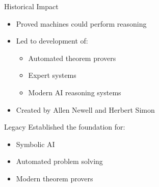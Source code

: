 \documentclass[aspectratio=169,t,xcolor=table]{beamer}
\begin{document}
\begin{frame}
\begin{columns}[t]
        \begin{column}{0.48\textwidth}
            \begin{block}{Historical Impact}
                \small
                \begin{itemize}\setlength{\itemsep}{0pt}
                    \item Proved machines could perform reasoning
                    \item Led to development of:
                    \begin{itemize}\setlength{\itemsep}{0pt}
                        \item Automated theorem provers
                        \item Expert systems
                        \item Modern AI reasoning systems
                    \end{itemize}
                    \item Created by Allen Newell and Herbert Simon
                \end{itemize}
            \end{block}
            
            \begin{exampleblock}{Legacy}
                \small
                Established the foundation for:
                \begin{itemize}\setlength{\itemsep}{0pt}
                    \item Symbolic AI
                    \item Automated problem solving
                    \item Modern theorem provers
                \end{itemize}
            \end{exampleblock}
        \end{column}
    \end{columns}
\end{frame}

\end{document}
